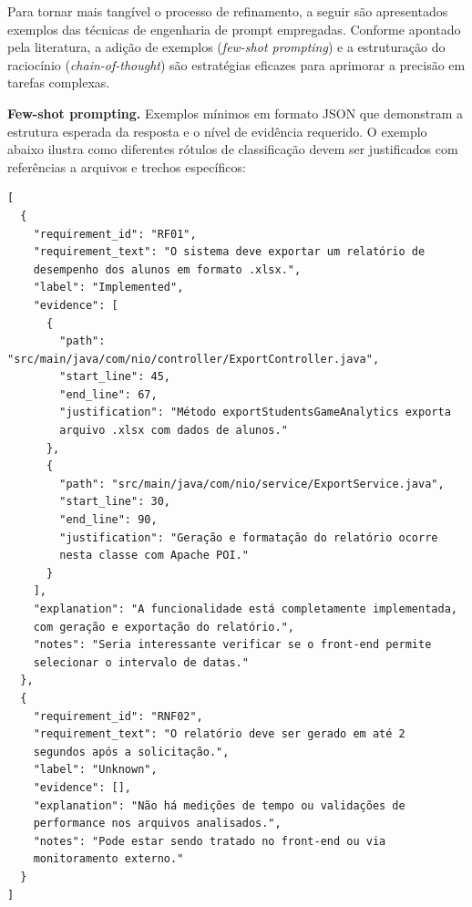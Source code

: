 Para tornar mais tangível o processo de refinamento, a seguir são apresentados exemplos das técnicas de engenharia de prompt empregadas. Conforme apontado pela literatura, a adição de exemplos (\textit{few-shot prompting}) e a estruturação do raciocínio (\textit{chain-of-thought}) são estratégias eficazes para aprimorar a precisão em tarefas complexas.

\textbf{Few-shot prompting.}
Exemplos mínimos em formato JSON que demonstram a estrutura esperada da resposta e o nível de evidência requerido. O exemplo abaixo ilustra como diferentes rótulos de classificação devem ser justificados com referências a arquivos e trechos específicos:


\begin{verbatim}
[
  {
    "requirement_id": "RF01",
    "requirement_text": "O sistema deve exportar um relatório de 
    desempenho dos alunos em formato .xlsx.",
    "label": "Implemented",
    "evidence": [
      {
        "path": "src/main/java/com/nio/controller/ExportController.java",
        "start_line": 45,
        "end_line": 67,
        "justification": "Método exportStudentsGameAnalytics exporta 
        arquivo .xlsx com dados de alunos."
      },
      {
        "path": "src/main/java/com/nio/service/ExportService.java",
        "start_line": 30,
        "end_line": 90,
        "justification": "Geração e formatação do relatório ocorre 
        nesta classe com Apache POI."
      }
    ],
    "explanation": "A funcionalidade está completamente implementada, 
    com geração e exportação do relatório.",
    "notes": "Seria interessante verificar se o front-end permite 
    selecionar o intervalo de datas."
  },
  {
    "requirement_id": "RNF02",
    "requirement_text": "O relatório deve ser gerado em até 2 
    segundos após a solicitação.",
    "label": "Unknown",
    "evidence": [],
    "explanation": "Não há medições de tempo ou validações de 
    performance nos arquivos analisados.",
    "notes": "Pode estar sendo tratado no front-end ou via 
    monitoramento externo."
  }
]
\end{verbatim}
\label{alg:prompt_examples}

\vspace{2em}


